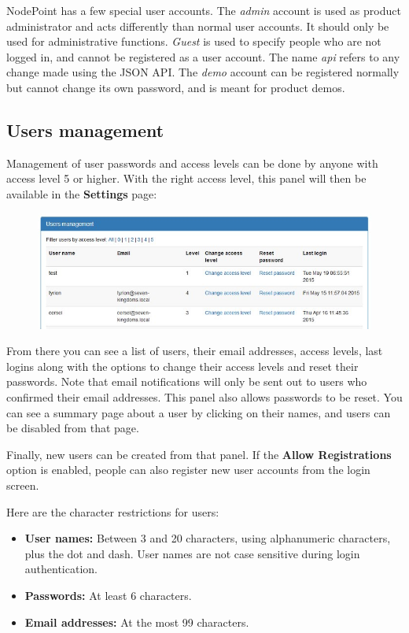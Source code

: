 \documentclass[11pt]{article}
\begin{document}
NodePoint has a few special user accounts. The \textit{admin} account is used as product administrator and acts differently than normal user accounts. It should only be used for administrative functions. \textit{Guest} is used to specify people who are not logged in, and cannot be registered as a user account. The name \textit{api} refers to any change made using the JSON API. The \textit{demo} account can be registered normally but cannot change its own password, and is meant for product demos.

\subsection{Users management}
Management of user passwords and access levels can be done by anyone with access level 5 or higher. With the right access level, this panel will then be available in the \textbf{Settings} page:

\begin{figure}[h]
\includegraphics{userman.jpg}
\end{figure}

From there you can see a list of users, their email addresses, access levels, last logins along with the options to change their access levels and reset their passwords. Note that email notifications will only be sent out to users who confirmed their email addresses. This panel also allows passwords to be reset. You can see a summary page about a user by clicking on their names, and users can be disabled from that page.

Finally, new users can be created from that panel. If the \textbf{Allow Registrations} option is enabled, people can also register new user accounts from the login screen.

Here are the character restrictions for users:

\begin{itemize}
\item \textbf{User names:} Between 3 and 20 characters, using alphanumeric characters, plus the dot and dash. User names are not case sensitive during login authentication.
\item \textbf{Passwords:} At least 6 characters.
\item \textbf{Email addresses:} At the most 99 characters.
\end{itemize}
\end{document}
